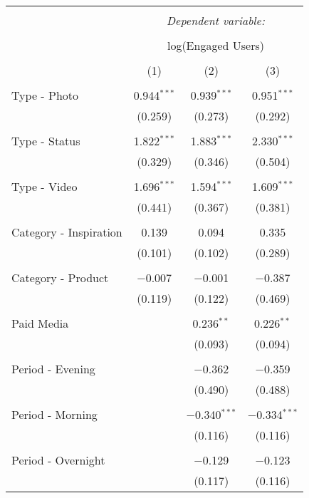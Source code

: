 \documentclass[
]{article}
\begin{document}
\begin{longtable}{@{\extracolsep{5pt}}lccc}
  \caption{} 
  \label{} 

\\[-1.8ex]\hline 
\hline \\[-1.8ex] 
 & \multicolumn{3}{c}{\textit{Dependent variable:}} \\ 
\cline{2-4} 
\\[-1.8ex] & \multicolumn{3}{c}{log(Engaged Users)} \\ 
\\[-1.8ex] & (1) & (2) & (3)\\ 
\hline \\[-1.8ex] 
 Type - Photo & 0.944$^{***}$ & 0.939$^{***}$ & 0.951$^{***}$ \\ 
  & (0.259) & (0.273) & (0.292) \\ 
  & & & \\ 
 Type - Status & 1.822$^{***}$ & 1.883$^{***}$ & 2.330$^{***}$ \\ 
  & (0.329) & (0.346) & (0.504) \\ 
  & & & \\ 
 Type - Video & 1.696$^{***}$ & 1.594$^{***}$ & 1.609$^{***}$ \\ 
  & (0.441) & (0.367) & (0.381) \\ 
  & & & \\ 
 Category - Inspiration & 0.139 & 0.094 & 0.335 \\ 
  & (0.101) & (0.102) & (0.289) \\ 
  & & & \\ 
 Category - Product & $-$0.007 & $-$0.001 & $-$0.387 \\ 
  & (0.119) & (0.122) & (0.469) \\ 
  & & & \\ 
 Paid Media &  & 0.236$^{**}$ & 0.226$^{**}$ \\ 
  &  & (0.093) & (0.094) \\ 
  & & & \\ 
 Period - Evening &  & $-$0.362 & $-$0.359 \\ 
  &  & (0.490) & (0.488) \\ 
  & & & \\ 
 Period - Morning &  & $-$0.340$^{***}$ & $-$0.334$^{***}$ \\ 
  &  & (0.116) & (0.116) \\ 
  & & & \\ 
 Period - Overnight &  & $-$0.129 & $-$0.123 \\ 
  &  & (0.117) & (0.116) \\ 

\end{longtable}
\end{document}
